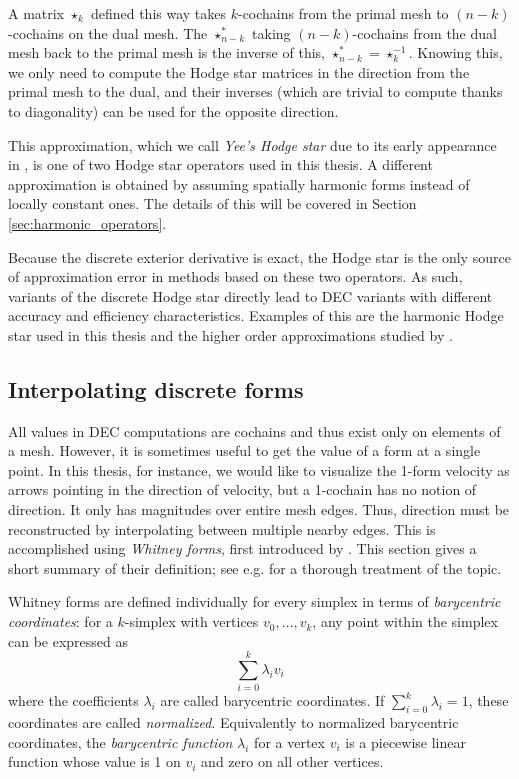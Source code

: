 \documentclass[utf8,english]{gradu3}
\begin{document}
A matrix $\star_k$ defined this way takes $k$-cochains from the primal mesh
to $(n-k)$-cochains on the dual mesh.
The $\star^*_{n-k}$ taking $(n-k)$-cochains from the dual mesh back to the primal mesh
is the inverse of this, $\star^*_{n-k} = \star_k^{-1}$.
Knowing this, we only need to compute the Hodge star matrices
in the direction from the primal mesh to the dual, and their inverses
(which are trivial to compute thanks to diagonality)
can be used for the opposite direction.

This approximation, which we call \textit{Yee's Hodge star}
due to its early appearance in \textcite{yee_numerical_1966},
is one of two Hodge star operators used in this thesis.
A different approximation is obtained by assuming spatially harmonic forms
instead of locally constant ones.
The details of this will be covered in Section \ref{sec:harmonic_operators}.

Because the discrete exterior derivative is exact,
the Hodge star is the only source of approximation error
in methods based on these two operators.
As such, variants of the discrete Hodge star directly lead to
DEC variants with different accuracy and efficiency characteristics.
Examples of this are the harmonic Hodge star used in this thesis
and the higher order approximations studied by \textcite{lohi_higher_2023}.


\subsection{Interpolating discrete forms}\label{sec:interpolation}

All values in DEC computations are cochains
and thus exist only on elements of a mesh.
However, it is sometimes useful to get the value of a form at a single point.
In this thesis, for instance, we would like to visualize
the 1-form velocity as arrows pointing in the direction of velocity,
but a 1-cochain has no notion of direction.
It only has magnitudes over entire mesh edges.
Thus, direction must be reconstructed by interpolating between multiple nearby edges.
This is accomplished using \textit{Whitney forms},
first introduced by \textcite{whitney_geometric_1957}.
This section gives a short summary of their definition;
see e.g. \textcite{lohi_whitney_2021} for a thorough treatment of the topic.

Whitney forms are defined individually for every simplex
in terms of \textit{barycentric coordinates}:
for a $k$-simplex with vertices $v_0, \dots, v_k$,
any point within the simplex can be expressed as
\[
  \sum_{i=0}^k \lambda_i v_i
\]
where the coefficients $\lambda_i$ are called barycentric coordinates.
If $\sum_{i=0}^k \lambda_i = 1$, these coordinates are called \textit{normalized}.
Equivalently to normalized barycentric coordinates,
the \textit{barycentric function} $\lambda_i$ for a vertex $v_i$
is a piecewise linear function whose value is 1 on $v_i$
and zero on all other vertices.
\end{document}
